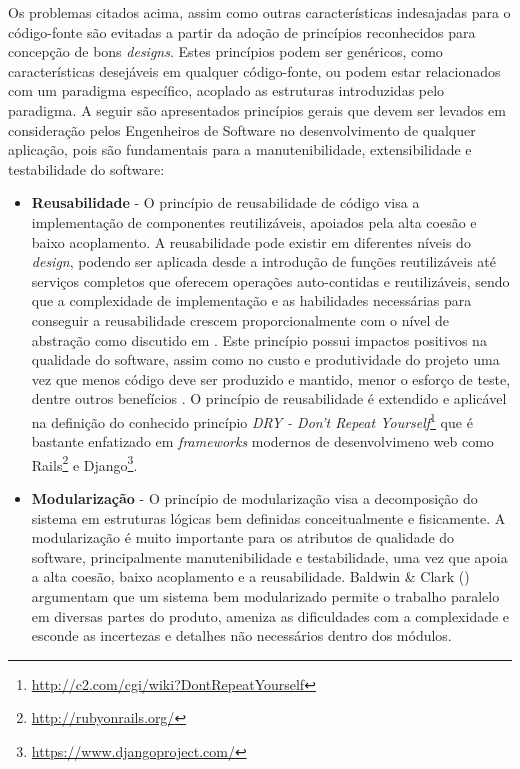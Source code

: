 %

Os problemas citados acima, assim como outras características indesajadas para o código-fonte são evitadas a partir da adoção de princípios reconhecidos para concepção de bons \emph{designs}. Estes princípios podem ser genéricos, como características desejáveis em qualquer código-fonte, ou podem estar relacionados com um paradigma específico, acoplado as estruturas introduzidas pelo paradigma. A seguir são apresentados princípios gerais que devem ser levados em consideração pelos Engenheiros de Software no desenvolvimento de qualquer aplicação, pois são fundamentais para a manutenibilidade, extensibilidade e testabilidade do software:

\begin{itemize}
\item \textbf{Reusabilidade} - O princípio de reusabilidade de código visa a implementação de componentes reutilizáveis, apoiados pela alta coesão e baixo acoplamento. A reusabilidade pode existir em diferentes níveis do \emph{design}, podendo ser aplicada desde a introdução de funções reutilizáveis até serviços completos que oferecem operações auto-contidas e reutilizáveis, sendo que a complexidade de implementação e as habilidades necessárias para conseguir a reusabilidade crescem proporcionalmente com o nível de abstração como discutido em \cite{cruise2007}. Este princípio possui impactos positivos na qualidade do software, assim como no custo e produtividade do projeto uma vez que menos código deve ser produzido e mantido, menor o esforço de teste, dentre outros benefícios \cite{sametinger1997}. O princípio de reusabilidade é extendido e aplicável na definição do conhecido princípio \emph{DRY - Don't Repeat Yourself}\footnote{\url{http://c2.com/cgi/wiki?DontRepeatYourself}} que é bastante enfatizado em \emph{frameworks} modernos de desenvolvimeno web como Rails\footnote{\url{http://rubyonrails.org/}} e Django\footnote{\url{https://www.djangoproject.com/}}.
\item \textbf{Modularização} - O princípio de modularização visa a decomposição do sistema em estruturas lógicas bem definidas conceitualmente e fisicamente. A modularização é muito importante para os atributos de qualidade do software, principalmente manutenibilidade e testabilidade, uma vez que apoia a alta coesão, baixo acoplamento e a reusabilidade. Baldwin \& Clark (\citeyear{baldwin2000}) argumentam que um sistema bem modularizado permite o trabalho paralelo em diversas partes do produto, ameniza as dificuldades com a complexidade e esconde as incertezas e detalhes não necessários dentro dos módulos.

\end{itemize}
